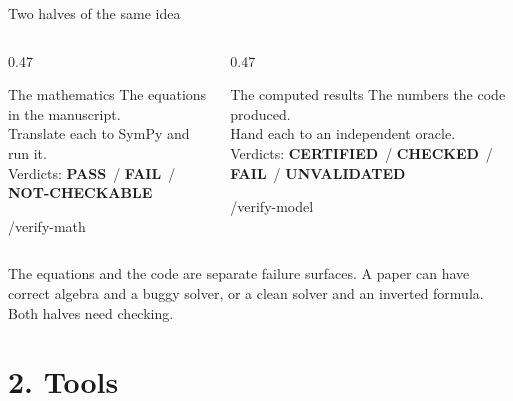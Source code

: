 \documentclass[aspectratio=169,11pt]{beamer}
\newcommand{\code}[1]{{\ttfamily\small #1}}
\newcommand{\PASS}{{\color{okgreen}\bfseries PASS}}
\newcommand{\FAIL}{{\color{badred}\bfseries FAIL}}
\newcommand{\CERT}{{\color{okgreen}\bfseries CERTIFIED}}
\newcommand{\CHK}{{\color{ink}\bfseries CHECKED}}
\newcommand{\UNV}{{\color{flagamber}\bfseries UNVALIDATED}}
\newcommand{\NC}{{\color{slate}\bfseries NOT-CHECKABLE}}
\begin{document}
\begin{frame}{Two halves of the same idea}
  \begin{columns}[T]
    \begin{column}{0.47\textwidth}
      \begin{block}{The mathematics}
        The equations in the manuscript.\\[0.4em]
        Translate each to SymPy and run it.\\[0.4em]
        Verdicts: \PASS\ / \FAIL\ / \NC
      \end{block}
      \code{/verify-math}
    \end{column}
    \begin{column}{0.47\textwidth}
      \begin{block}{The computed results}
        The numbers the code produced.\\[0.4em]
        Hand each to an independent oracle.\\[0.4em]
        Verdicts: \CERT\ / \CHK\ / \FAIL\ / \UNV
      \end{block}
      \code{/verify-model}
    \end{column}
  \end{columns}
  \vfill
  The equations and the code are separate failure surfaces. A paper can have correct algebra and a
  buggy solver, or a clean solver and an inverted formula. Both halves need checking.
\end{frame}

\section{2. Tools}
\begin{frame}[plain]
  \vfill{}\vfill
\end{frame}
\end{document}
